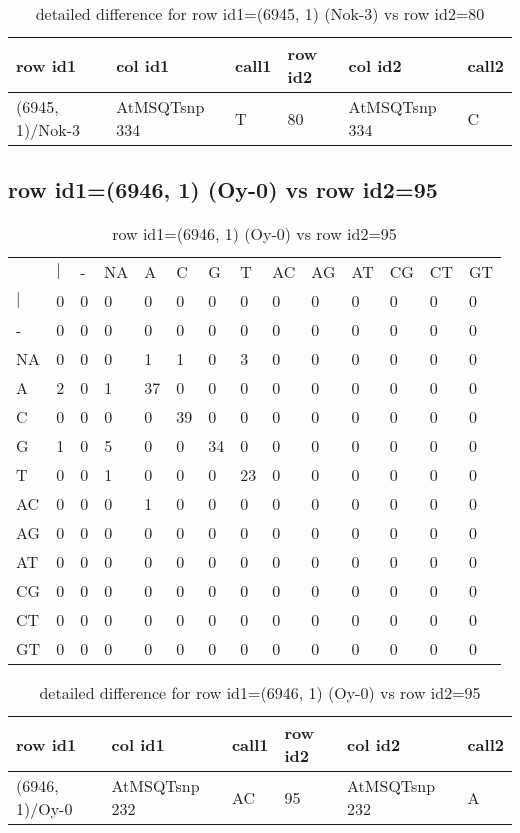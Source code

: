 \begin{center}
\begin{longtable}{|l|l|l|l|l|l|}
\caption{detailed difference for row id1=(6945, 1) (Nok-3) vs row id2=80} \label{table_dm157}\\
\hline
row id1&col id1&call1&row id2&col id2&call2\\
\hline
(6945, 1)/Nok-3&AtMSQTsnp 334&T&80&AtMSQTsnp 334&C\\
\hline
\end{longtable}
\end{center}

\subsection{row id1=(6946, 1) (Oy-0) vs row id2=95}
\begin{center}
\begin{longtable}{|l|l|l|l|l|l|l|l|l|l|l|l|l|l|}
\caption{row id1=(6946, 1) (Oy-0) vs row id2=95} \label{table_dm158}\\
\hline
\\
\hline
&$|$&-&NA&A&C&G&T&AC&AG&AT&CG&CT&GT\\
$|$&0&0&0&0&0&0&0&0&0&0&0&0&0\\
-&0&0&0&0&0&0&0&0&0&0&0&0&0\\
NA&0&0&0&1&1&0&3&0&0&0&0&0&0\\
A&2&0&1&37&0&0&0&0&0&0&0&0&0\\
C&0&0&0&0&39&0&0&0&0&0&0&0&0\\
G&1&0&5&0&0&34&0&0&0&0&0&0&0\\
T&0&0&1&0&0&0&23&0&0&0&0&0&0\\
AC&0&0&0&1&0&0&0&0&0&0&0&0&0\\
AG&0&0&0&0&0&0&0&0&0&0&0&0&0\\
AT&0&0&0&0&0&0&0&0&0&0&0&0&0\\
CG&0&0&0&0&0&0&0&0&0&0&0&0&0\\
CT&0&0&0&0&0&0&0&0&0&0&0&0&0\\
GT&0&0&0&0&0&0&0&0&0&0&0&0&0\\
\hline
\end{longtable}
\end{center}

\begin{center}
\begin{longtable}{|l|l|l|l|l|l|}
\caption{detailed difference for row id1=(6946, 1) (Oy-0) vs row id2=95} \label{table_dm159}\\
\hline
row id1&col id1&call1&row id2&col id2&call2\\
\hline
(6946, 1)/Oy-0&AtMSQTsnp 232&AC&95&AtMSQTsnp 232&A\\
\hline
\end{longtable}
\end{center}

